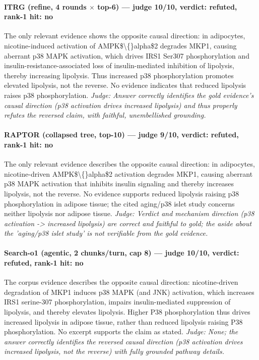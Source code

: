 \documentclass[sigconf, review, anonymous]{acmart}
\begin{document}
\paragraph{ITRG (refine, 4 rounds $\times$ top-6) --- judge 10/10, verdict: refuted, rank-1 hit: no}
\noindent The only relevant evidence shows the opposite causal direction: in adipocytes, nicotine-induced activation of AMPK\$\textbackslash\{\}alpha\$2 degrades MKP1, causing aberrant p38 MAPK activation, which drives IRS1 Ser307 phosphorylation and insulin-resistance-associated loss of insulin-mediated inhibition of lipolysis, thereby increasing lipolysis. Thus increased p38 phosphorylation promotes elevated lipolysis, not the reverse. No evidence indicates that reduced lipolysis raises p38 phosphorylation.
\noindent\small\textit{Judge: Answer correctly identifies the gold evidence's causal direction (p38 activation drives increased lipolysis) and thus properly refutes the reversed claim, with faithful, unembellished grounding.}
\paragraph{RAPTOR (collapsed tree, top-10) --- judge 9/10, verdict: refuted, rank-1 hit: no}
\noindent The only relevant evidence describes the opposite causal direction: in adipocytes, nicotine-driven AMPK\$\textbackslash\{\}alpha\$2 activation degrades MKP1, causing aberrant p38 MAPK activation that inhibits insulin signaling and thereby increases lipolysis, not the reverse. No evidence supports reduced lipolysis raising p38 phosphorylation in adipose tissue; the cited aging/p38 islet study concerns neither lipolysis nor adipose tissue.
\noindent\small\textit{Judge: Verdict and mechanism direction (p38 activation -> increased lipolysis) are correct and faithful to gold; the aside about the 'aging/p38 islet study' is not verifiable from the gold evidence.}
\paragraph{Search-o1 (agentic, 2 chunks/turn, cap 8) --- judge 10/10, verdict: refuted, rank-1 hit: no}
\noindent The corpus evidence describes the opposite causal direction: nicotine-driven degradation of MKP1 induces p38 MAPK (and JNK) activation, which increases IRS1 serine-307 phosphorylation, impairs insulin-mediated suppression of lipolysis, and thereby elevates lipolysis. Higher P38 phosphorylation thus drives increased lipolysis in adipose tissue, rather than reduced lipolysis raising P38 phosphorylation. No excerpt supports the claim as stated.
\noindent\small\textit{Judge: None; the answer correctly identifies the reversed causal direction (p38 activation drives increased lipolysis, not the reverse) with fully grounded pathway details.}
\end{document}
